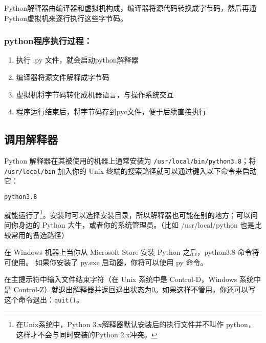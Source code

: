 
\begin{issues}
\issueTODO
\issueDraft
\end{issues}


Python解释器由编译器和虚拟机构成，编译器将源代码转换成字节码，然后再通Python虚拟机来逐行执行这些字节码。

\subsubsection{python程序执行过程：}

\begin{enumerate}
\item 执行 .py 文件，就会启动python解释器

\item 编译器将源文件解释成字节码

\item 虚拟机将字节码转化成机器语言，与操作系统交互

\item 程序运行结束后，将字节码存到pyc文件，便于后续直接执行
\end{enumerate}

\subsection{调用解释器}
Python 解释器在其被使用的机器上通常安装为 \verb`/usr/local/bin/python3.8`；将 \verb`/usr/local/bin` 加入你的 Unix 终端的搜索路径就可以通过键入以下命令来启动它：

\begin{lstlisting}[language=bash]
python3.8
\end{lstlisting}

就能运行了\footnote{在Unix系统中，Python 3.x解释器默认安装后的执行文件并不叫作 python，这样才不会与同时安装的Python 2.x冲突。}。安装时可以选择安装目录，所以解释器也可能在别的地方；可以问问你身边的 Python 大牛，或者你的系统管理员。（比如 /usr/local/python 也是比较常用的备选路径）

在 Windows 机器上当你从 Microsoft Store 安装 Python 之后，python3.8 命令将可使用。 如果你安装了 py.exe 启动器，你将可以使用 py 命令。

在主提示符中输入文件结束字符（在 Unix 系统中是 Control-D，Windows 系统中是 Control-Z）就退出解释器并返回退出状态为0。如果这样不管用，你还可以写这个命令退出：\verb`quit()`。


